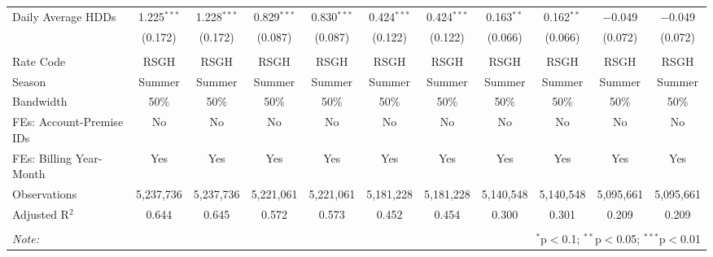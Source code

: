 \begin{table}[!htbp]
\begin{adjustbox}{scale = 0.75}
\begin{tabular}{@{\extracolsep{5pt}}lcccccccccc}
 Daily Average HDDs & 1.225$^{***}$ & 1.228$^{***}$ & 0.829$^{***}$ & 0.830$^{***}$ & 0.424$^{***}$ & 0.424$^{***}$ & 0.163$^{**}$ & 0.162$^{**}$ & $-$0.049 & $-$0.049 \\ 
  & (0.172) & (0.172) & (0.087) & (0.087) & (0.122) & (0.122) & (0.066) & (0.066) & (0.072) & (0.072) \\ 
\hline \\[-1.8ex] 
Rate Code & RSGH & RSGH & RSGH & RSGH & RSGH & RSGH & RSGH & RSGH & RSGH & RSGH \\ 
Season & Summer & Summer & Summer & Summer & Summer & Summer & Summer & Summer & Summer & Summer \\ 
Bandwidth & 50\% & 50\% & 50\% & 50\% & 50\% & 50\% & 50\% & 50\% & 50\% & 50\% \\ 
FEs: Account-Premise IDs & No & No & No & No & No & No & No & No & No & No \\ 
FEs: Billing Year-Month & Yes & Yes & Yes & Yes & Yes & Yes & Yes & Yes & Yes & Yes \\ 
Observations & 5,237,736 & 5,237,736 & 5,221,061 & 5,221,061 & 5,181,228 & 5,181,228 & 5,140,548 & 5,140,548 & 5,095,661 & 5,095,661 \\ 
Adjusted R$^{2}$ & 0.644 & 0.645 & 0.572 & 0.573 & 0.452 & 0.454 & 0.300 & 0.301 & 0.209 & 0.209 \\ 
\hline 
\hline \\[-1.8ex] 
\textit{Note:}  & \multicolumn{10}{r}{$^{*}$p$<$0.1; $^{**}$p$<$0.05; $^{***}$p$<$0.01} \\ 
\end{tabular} 
\end{adjustbox}
\end{table} 
